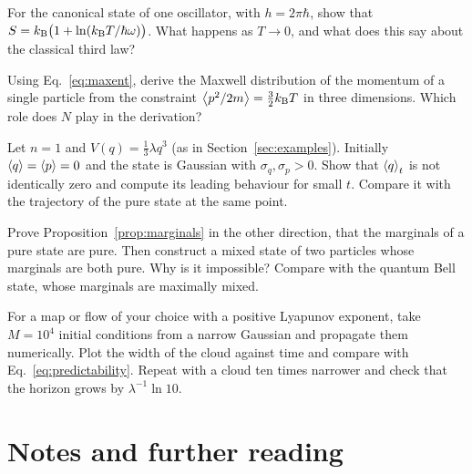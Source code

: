 \begin{exercise}
For the canonical state of one oscillator, with $h=2\pi\hbar$, show that $S=k_{\mathrm B}\bigl(1+\ln(k_{\mathrm B} T/\hbar\omega)\bigr)$. What happens as $T\to0$, and what does this say about the classical third law?
\end{exercise}

\begin{exercise}
Using Eq.~\eqref{eq:maxent}, derive the Maxwell distribution of the momentum of a single particle from the constraint $\left\langle p^2/2m\right\rangle=\tfrac32k_{\mathrm B} T$ in three dimensions. Which role does $N$ play in the derivation?
\end{exercise}

\begin{exercise}
Let $n=1$ and $V(q)=\tfrac13\lambda q^3$ (as in Section~\ref{sec:examples}). Initially $\left\langle q\right\rangle=\left\langle p\right\rangle=0$ and the state is Gaussian with $\sigma_q,\sigma_p>0$. Show that $\left\langle q\right\rangle_t$ is not identically zero and compute its leading behaviour for small $t$. Compare it with the trajectory of the pure state at the same point.
\end{exercise}

\begin{exercise}
Prove Proposition~\ref{prop:marginals} in the other direction, that the marginals of a pure state are pure. Then construct a mixed state of two particles whose marginals are both pure. Why is it impossible? Compare with the quantum Bell state, whose marginals are maximally mixed.
\end{exercise}

\begin{exercise}
For a map or flow of your choice with a positive Lyapunov exponent, take $M=10^4$ initial conditions from a narrow Gaussian and propagate them numerically. Plot the width of the cloud against time and compare with Eq.~\eqref{eq:predictability}. Repeat with a cloud ten times narrower and check that the horizon grows by $\lambda^{-1}\ln10$.
\end{exercise}

\section*{Notes and further reading}

